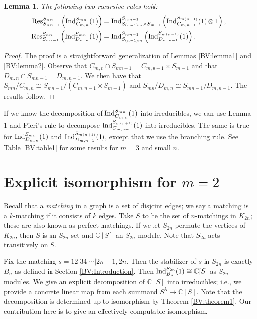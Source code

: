 \documentclass[12pt]{amsart}
\newtheorem{lemma}[theorem]{Lemma}
\numberwithin{theorem}{section}
\newcommand{\CC}{\mathbb{C}}
\newcommand{\Ind}{\textup{Ind}}
\newcommand{\Res}{\textup{Res}}
\begin{document}
\begin{lemma}\label{BV:lemma3}
The following two recursive rules hold:
\begin{align*}
\Res_{S_{nm-1}}^{S_{nm}}\left(\Ind_{C_{m,n}}^{S_{mn}}(1)\right) &= \Ind_{S_{(n-1)m} \times S_{m-1}}^{S_{nm-1}}\left(\Ind_{C_{m,n-1}}^{S_{m(n-1)}}(1) \otimes 1\right), \\
\Res_{S_{nm-1}}^{S_{nm}}\left(\Ind_{D_{m,n}}^{S_{mn}}(1)\right) &= \Ind_{S_{(n-1)m} }^{S_{nm-1}}\left(\Ind_{D_{m,n-1}}^{S_{m(n-1)}}(1)\right).
\end{align*}
\end{lemma}
\begin{proof}
The proof is a straightforward generalization of Lemmas \ref{BV:lemma1} and \ref{BV:lemma2}.
Observe that $C_{m,n} \cap S_{mn-1} = C_{m,n-1} \times S_{m-1}$ and that $D_{m,n} \cap S_{mn-1} = D_{m,n-1}$.
We then have that $S_{mn} / C_{m,n} \cong S_{mn-1} / (C_{m,n-1} \times S_{m-1})$ and 
$S_{mn} / D_{m,n} \cong S_{mn-1} / D_{m,n-1}$. The results follow.
\end{proof}
If we know the decomposition of $\Ind_{C_{m,n}}^{S_{mn}}(1)$ into irreducibles, we can use Lemma \ref{BV:lemma3} and Pieri's rule to decompose $\Ind_{C_{m,n+1}}^{S_{m(n+1)}}(1)$ into irreducibles. The same is true for $\Ind_{D_{m,n}}^{S_{mn}}(1)$ and $\Ind_{D_{m,n+1}}^{S_{m(n+1)}}(1)$, except that we use the branching rule. See Table \ref{BV:table1} for some results for $m=3$ and small $n$.

\section{Explicit isomorphism for $m=2$}\label{BV:section3}
Recall that a {\em matching} in a graph is a set of disjoint edges; we say a matching is a $k$-matching if it consists of $k$ edges. Take $S$ to be the set of $n$-matchings in $K_{2n}$; these are also known as perfect matchings. If we let $S_{2n}$ permute the vertices of $K_{2n}$, then $S$ is an $S_{2n}$-set and $\CC[S]$ an $S_{2n}$-module. Note that $S_{2n}$ acts transitively on $S$. 

Fix the matching $s = 12|34|\cdots|2n-1,2n$. Then the stabilizer of $s$ in $S_{2n}$ is exactly $B_n$ as defined in Section 
\ref{BV:Introduction}. Then $\Ind_{B_n}^{S_{2n}}(1) \cong \CC[S]$ as $S_{2n}$-modules. We give an explicit decomposition of $\CC[S]$ into irreducibles; i.e., we provide a concrete linear map from each summand $S^\lambda \to \CC[S]$. Note that the decomposition is determined up to isomorphism by Theorem \ref{BV:theorem1}. Our contribution here is to give an effectively computable isomorphism.
\end{document}
